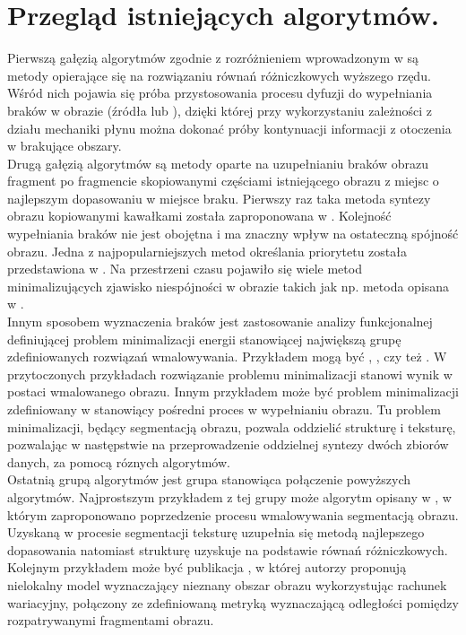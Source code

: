 \documentclass[12pt, twoside, openany]{report}
\theoremstyle{definition}
\begin{document}
\chapter{Przegląd istniejących algorytmów.}
Pierwszą gałęzią algorytmów zgodnie z rozróżnieniem wprowadzonym w  \cite{SalientStrucTexProp} są metody opierające się na rozwiązaniu równań różniczkowych wyższego rzędu. Wśród nich pojawia się próba przystosowania procesu dyfuzji do wypełniania braków w obrazie (źródła \cite{bertalmio2000image} lub \cite{BertalmioNavierStokes}), dzięki której przy wykorzystaniu zależności z działu mechaniki płynu można dokonać próby kontynuacji informacji z otoczenia w brakujące obszary. \\
Drugą gałęzią algorytmów są metody oparte na uzupełnianiu braków obrazu fragment po fragmencie skopiowanymi częściami istniejącego obrazu z miejsc o najlepszym dopasowaniu w miejsce braku. Pierwszy raz taka metoda syntezy obrazu kopiowanymi kawałkami została zaproponowana w \cite{efros1999texture}. Kolejność wypełniania braków nie jest obojętna i ma znaczny wpływ na ostateczną spójność obrazu. Jedna z najpopularniejszych metod określania priorytetu została przedstawiona w \cite{criminisi2004region}. Na przestrzeni czasu pojawiło się wiele metod minimalizujących zjawisko niespójności w obrazie takich jak np. metoda opisana w  \cite{StructurePropagationManual}. \\
Innym sposobem wyznaczenia braków jest zastosowanie analizy funkcjonalnej definiującej problem minimalizacji energii stanowiącej największą grupę zdefiniowanych rozwiązań wmalowywania. Przykładem mogą być \cite{MathematicalModelsforNLTextureInpainting}, \cite{ColorTextureInpaintingNLCTVModel}, czy też \cite{arias2011variational}. W przytoczonych przykładach rozwiązanie problemu minimalizacji stanowi wynik w postaci wmalowanego obrazu. Innym przykładem może być problem minimalizacji zdefiniowany w \cite{SalientStrucTexProp} stanowiący pośredni proces w wypełnianiu obrazu. Tu problem minimalizacji, będący segmentacją obrazu, pozwala oddzielić strukturę i teksturę, pozwalając w następstwie na przeprowadzenie oddzielnej syntezy dwóch zbiorów danych, za pomocą róznych algorytmów. \\
Ostatnią grupą algorytmów jest grupa stanowiąca połączenie powyższych algorytmów. Najprostszym przykładem z tej grupy może algorytm opisany w \cite{NavierStokesAndTexturePropagation}, w którym zaproponowano poprzedzenie procesu wmalowywania segmentacją obrazu. Uzyskaną w procesie segmentacji teksturę uzupełnia się metodą najlepszego dopasowania natomiast strukturę uzyskuje na podstawie równań różniczkowych. Kolejnym przykładem może być publikacja \cite{arias2011variational}, w której autorzy proponują nielokalny model wyznaczający nieznany obszar obrazu wykorzystując rachunek wariacyjny, połączony ze zdefiniowaną metryką wyznaczającą odległości pomiędzy rozpatrywanymi fragmentami obrazu. \\
\end{document}
